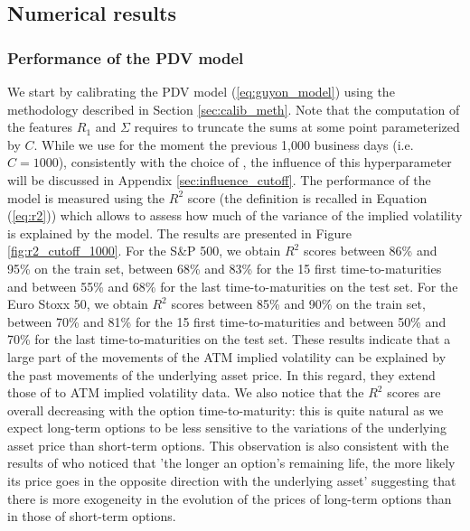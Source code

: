 \subsection{Numerical results}\label{sec:empirical_study_numerical_results}
\subsubsection{Performance of the PDV model}\label{sec:overall_perf}
We start by calibrating the PDV model (\ref{eq:guyon_model}) using the methodology described in Section \ref{sec:calib_meth}. Note that the computation of the features $R_1$ and $\Sigma$ requires to truncate the sums at some point parameterized by $C$. While we use for the moment the previous 1,000 business days (i.e. $C=1000$), consistently with the choice of \cite{guyon2022volatility}, the influence of this hyperparameter will be discussed in Appendix \ref{sec:influence_cutoff}. The performance of the model is measured using the $R^2$ score (the definition is recalled in Equation (\ref{eq:r2})) which allows to assess how much of the variance of the implied volatility is explained by the model. The results are presented in Figure \ref{fig:r2_cutoff_1000}. For the S\&P 500, we obtain $R^2$ scores between 86\% and 95\% on the train set, between 68\% and 83\% for the 15 first time-to-maturities and between 55\% and 68\% for the last time-to-maturities on the test set. For the Euro Stoxx 50, we obtain $R^2$ scores between 85\% and 90\% on the train set, between 70\% and 81\% for the 15 first time-to-maturities and between 50\% and 70\% for the last time-to-maturities on the test set. These results indicate that a large part of the movements of the ATM implied volatility can be explained by the past movements of the underlying asset price. In this regard, they extend those of \cite{guyon2022volatility} to ATM implied volatility data. We also notice that the $R^2$ scores are overall decreasing with the option time-to-maturity: this is quite natural as we expect long-term options to be less sensitive to the variations of the underlying asset price than short-term options. This observation is also consistent with the results of \cite{bakshi2000call} who noticed that 'the longer an option’s remaining life, the more likely its price goes in the opposite direction with the underlying asset' suggesting that there is more exogeneity in the evolution of the prices of long-term options than in those of short-term options. \\

